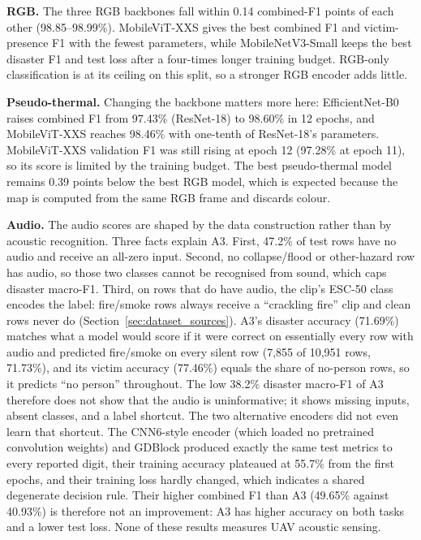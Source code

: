 \documentclass[journal]{IEEEtran}
\begin{document}
\textbf{RGB.} The three RGB backbones fall within 0.14 combined-F1 points of each other (98.85--98.99\%). MobileViT-XXS gives the best combined F1 and victim-presence F1 with the fewest parameters, while MobileNetV3-Small keeps the best disaster F1 and test loss after a four-times longer training budget. RGB-only classification is at its ceiling on this split, so a stronger RGB encoder adds little.

\textbf{Pseudo-thermal.} Changing the backbone matters more here: EfficientNet-B0 raises combined F1 from 97.43\% (ResNet-18) to 98.60\% in 12 epochs, and MobileViT-XXS reaches 98.46\% with one-tenth of ResNet-18's parameters. MobileViT-XXS validation F1 was still rising at epoch 12 (97.28\% at epoch 11), so its score is limited by the training budget. The best pseudo-thermal model remains 0.39 points below the best RGB model, which is expected because the map is computed from the same RGB frame and discards colour.

\textbf{Audio.} The audio scores are shaped by the data construction rather than by acoustic recognition. Three facts explain A3. First, 47.2\% of test rows have no audio and receive an all-zero input. Second, no collapse/flood or other-hazard row has audio, so those two classes cannot be recognised from sound, which caps disaster macro-F1. Third, on rows that do have audio, the clip's ESC-50 class encodes the label: fire/smoke rows always receive a ``crackling fire'' clip and clean rows never do (Section~\ref{sec:dataset_sources}). A3's disaster accuracy (71.69\%) matches what a model would score if it were correct on essentially every row with audio and predicted fire/smoke on every silent row (7{,}855 of 10{,}951 rows, 71.73\%), and its victim accuracy (77.46\%) equals the share of no-person rows, so it predicts ``no person'' throughout. The low 38.2\% disaster macro-F1 of A3 therefore does not show that the audio is uninformative; it shows missing inputs, absent classes, and a label shortcut. The two alternative encoders did not even learn that shortcut. The CNN6-style encoder (which loaded no pretrained convolution weights) and GDBlock produced exactly the same test metrics to every reported digit, their training accuracy plateaued at 55.7\% from the first epochs, and their training loss hardly changed, which indicates a shared degenerate decision rule. Their higher combined F1 than A3 (49.65\% against 40.93\%) is therefore not an improvement: A3 has higher accuracy on both tasks and a lower test loss. None of these results measures UAV acoustic sensing.
\end{document}
